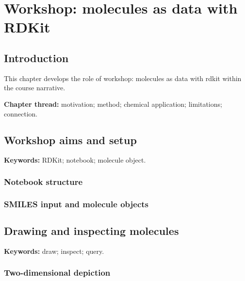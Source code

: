 
\chapter{Workshop: molecules as data with RDKit}

\section{Introduction}

This chapter develops the role of workshop: molecules as data with rdkit within the course narrative.

\begin{insightbox}
\textbf{Chapter thread:} motivation; method; chemical application; limitations; connection.
\end{insightbox}

\section{Workshop aims and setup}

\begin{conceptbox}
\textbf{Keywords:} RDKit; notebook; molecule object.
\end{conceptbox}

\subsection{Notebook structure}


\subsection{SMILES input and molecule objects}


\section{Drawing and inspecting molecules}

\begin{methodbox}
\textbf{Keywords:} draw; inspect; query.
\end{methodbox}

\subsection{Two-dimensional depiction}

